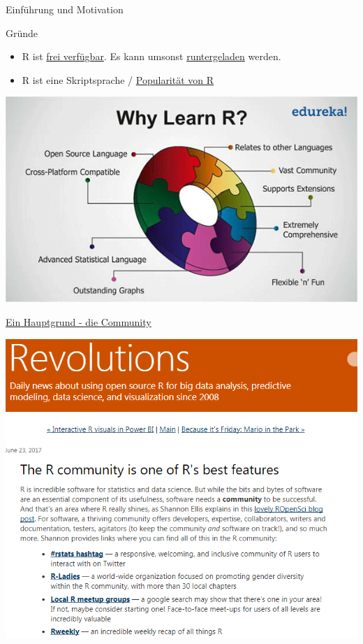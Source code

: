 \documentclass[ignorenonframetext,]{beamer}
\providecommand{\tightlist}{%
\setlength{\itemsep}{0pt}\setlength{\parskip}{0pt}}
\begin{document}
\begin{frame}[fragile]{Einführung und Motivation}

\begin{block}{Gründe}

\begin{itemize}
\tightlist
\item
  R ist \href{https://www.r-project.org/}{frei verfügbar}. Es kann
  umsonst \href{http://www.inside-r.org/why-use-r}{runtergeladen}
  werden.
\item
  R ist eine Skriptsprache /
  \href{http://blog.revolutionanalytics.com/popularity/}{Popularität von
  R}
\end{itemize}

\includegraphics{./tex2pdf.9796/364f0e44020784f8f6fab163de30b05c0ebf3d95.png}

\end{block}

\begin{block}{\href{http://blog.revolutionanalytics.com/2017/06/r-community.html}{Ein
Hauptgrund - die Community}}

\includegraphics{./tex2pdf.9796/415849dd5b649c98c5239b741c3eeed83870e473.png}


\end{block}
\end{frame}
\end{document}
